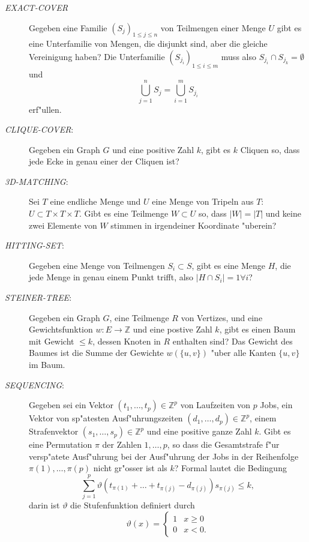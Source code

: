 \begin{description}
\item[\textsl{EXACT-COVER}] Gegeben eine Familie $(S_j)_{1\le j\le n}$
von Teilmengen
einer Menge $U$ gibt es eine Unterfamilie von Mengen, die disjunkt sind,
aber die gleiche Vereinigung haben?
Die Unterfamilie $(S_{j_i})_{1\le i\le m}$ muss also
$S_{j_i}\cap S_{j_k}=\emptyset$ und 
\[
\bigcup_{j=1}^n S_j=\bigcup_{i=1}^mS_{j_i}
\]
erf"ullen.
\item[\textsl{CLIQUE-COVER}:] Gegeben ein Graph $G$ und eine positive Zahl
$k$, gibt es $k$ Cliquen so, dass jede Ecke in genau einer der Cliquen ist?
\item[\textsl{3D-MATCHING}:] Sei $T$ eine endliche Menge und $U$ eine 
Menge von Tripeln aus $T$: $U\subset T\times T\times T$. Gibt es eine
Teilmenge $W\subset U$ so, dass $|W|=|T|$ und keine zwei Elemente
von $W$ stimmen in irgendeiner Koordinate "uberein?
\item[\textsl{HITTING-SET}:] Gegeben eine Menge von Teilmengen $S_i\subset S$,
gibt es eine Menge $H$, die jede Menge in genau einem Punkt trifft, also
$|H\cap S_i|=1\forall i$?
\item[\textsl{STEINER-TREE}:]
Gegeben ein Graph $G$, eine Teilmenge $R$ von Vertizes, und eine
Gewichtsfunktion $w\colon E\to\mathbb Z$ und eine postive Zahl $k$, gibt es
einen Baum mit Gewicht $\le k$, dessen Knoten in $R$ enthalten sind?
Das Gewicht des Baumes ist die Summe der Gewichte 
$w(\{u,v\})$ "uber alle Kanten $\{u,v\}$ im Baum.
\item[\textsl{SEQUENCING}:] Gegeben sei ein Vektor
$(t_1,\dots,t_p)\in\mathbb Z^p$
von Laufzeiten von $p$ Jobs, ein Vektor von sp"atesten Ausf"uhrungszeiten 
$(d_1,\dots,d_p)\in\mathbb Z^p$, einem Strafenvektor 
$(s_1,\dots,s_p)\in\mathbb Z^p$ und eine positive ganze Zahl $k$.
Gibt es eine Permutation $\pi$ der Zahlen $1,\dots,p$, so dass
die Gesamtstrafe f"ur versp"atete Ausf"uhrung bei der Ausf"uhrung der Jobs
in der Reihenfolge $\pi(1),\dots,\pi(p)$ nicht gr"osser ist als $k$? 
Formal lautet die Bedingung
\[
\sum_{j=1}^p
\vartheta(t_{\pi(1)} +\dots +t_{\pi(j)} - d_{\pi(j)}) s_{\pi(j)} \le k,
\]
darin ist $\vartheta$ die Stufenfunktion definiert durch
\[
\vartheta(x)=\begin{cases}
1&x\ge 0\\
0&x<0.
\end{cases}
\]
\end{description}

